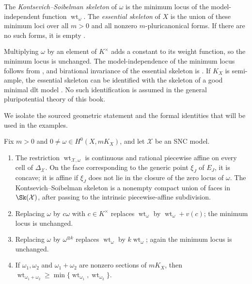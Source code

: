 \begin{definition}
\label{def:skeleton-essential}
The \emph{Kontsevich--Soibelman skeleton} of $\omega$ is the minimum locus
of the model-independent function $\operatorname{wt}_\omega$. The
\emph{essential skeleton} of $X$ is the union of these minimum loci over
all $m>0$ and all nonzero $m$-pluricanonical forms. If there are no such
forms, it is empty \cite[Definition~4.10]{MustataNicaise2015}.
\end{definition}

Multiplying $\omega$ by an element of $K^\times$ adds a constant to its
weight function, so the minimum locus is unchanged. The model-independence
of the minimum locus follows from
\cite[Theorem~4.7.5]{MustataNicaise2015}, and birational invariance of the
essential skeleton is \cite[Proposition~4.10.1]{MustataNicaise2015}.  If
$K_X$ is semi-ample, the essential skeleton can be identified with the
skeleton of a good minimal dlt model
\cite[Theorem~3.3.3]{NicaiseXu2016}.  No such identification is assumed in
the general pluripotential theory of this book.

We isolate the sourced geometric statement and the formal identities that
will be used in the examples.

\begin{lemma}
\label{lem:weight-elementary}
Fix $m>0$ and $0\neq\omega\in H^0(X,mK_X)$, and let $\mathcal X$ be an
SNC model.
\begin{enumerate}
\item The restriction $\operatorname{wt}_{\mathcal X,\omega}$ is continuous
  and rational piecewise affine on every cell of $\Delta_{\mathcal X}$.
  On the face corresponding to the generic point $\xi_J$ of $E_J$, it is
  concave; it is affine if $\xi_J$ does not lie in the closure of the zero
  locus of $\omega$.  The Kontsevich--Soibelman skeleton is a nonempty
  compact union of faces in $\Sk(\mathcal X)$, after passing to the
  intrinsic piecewise-affine subdivision.
\item Replacing $\omega$ by $c\omega$ with $c\in K^\times$ replaces
  $\operatorname{wt}_\omega$ by $\operatorname{wt}_\omega+v(c)$; the
  minimum locus is unchanged.
\item Replacing $\omega$ by $\omega^{\otimes k}$ replaces
  $\operatorname{wt}_\omega$ by $k\operatorname{wt}_\omega$; again the
  minimum locus is unchanged.
\item If $\omega_1,\omega_2$ and $\omega_1+\omega_2$ are nonzero sections
  of $mK_X$, then
  $\operatorname{wt}_{\omega_1+\omega_2}\ge
  \min\{\operatorname{wt}_{\omega_1},\operatorname{wt}_{\omega_2}\}$.
\end{enumerate}
\end{lemma}

